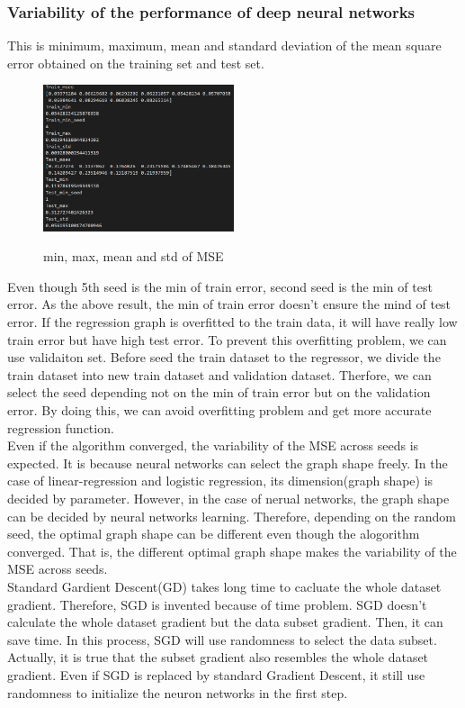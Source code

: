 \documentclass[a4paper]{article}
\begin{document}
\subsubsection{Variability of the performance of deep neural networks}
This is  minimum, maximum, mean and standard deviation of the mean square error obtained on the training set and test set. \\
\begin{figure}[h]
  \includegraphics[width=0.5\textwidth]{ex_1_1_b.png}\\
  \caption{min, max, mean and std of MSE}
\end{figure}
Even though 5th seed is the min of train error, second seed is the min of test error. As the above result, the min of train error doesn't ensure the mind of test error. If the regression graph is overfitted to the train data, it will have really low train error but have high test error. To prevent this overfitting problem, we can use validaiton set. Before seed the train dataset to the regressor, we divide the train dataset into new train dataset and validation dataset. Therfore, we can select the seed depending not on the min of train error but on the validation error. By doing this, we can avoid overfitting problem and get more accurate regression function.\\
Even if the algorithm converged, the variability of the MSE across seeds is expected. It is because neural networks can select the graph shape freely. In the case of linear-regression and logistic regression, its dimension(graph shape) is decided by parameter. However, in the case of nerual networks, the graph shape can be decided by neural networks learning. Therefore, depending on the random seed, the optimal graph shape can be different even though the alogorithm converged. That is, the different optimal graph shape makes the variability of the MSE across seeds.\\
Standard Gardient Descent(GD) takes long time to cacluate the whole dataset gradient. Therefore, SGD is invented because of time problem. SGD doesn't calculate the whole dataset gradient but the data subset gradient. Then, it can save time. In this process, SGD will use randomness to select the data subset. Actually, it is true that the subset gradient also resembles the whole dataset gradient. Even if SGD is replaced by standard Gradient Descent, it still use randomness to initialize the neuron networks in the first step.\\
\clearpage
\end{document}
